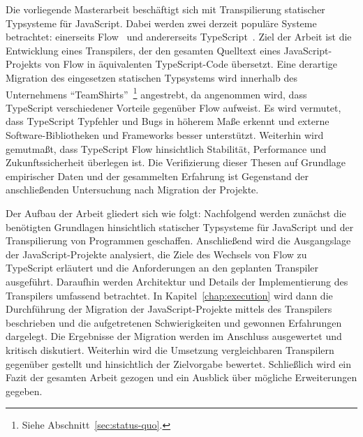 Die vorliegende Masterarbeit beschäftigt sich mit Transpilierung statischer Typsysteme für JavaScript. Dabei werden zwei derzeit populäre Systeme betrachtet: einerseits Flow~\autocite{FLOW_PAPER} und andererseits TypeScript~\autocite{TYPESCRIPT_SPEC}. Ziel der Arbeit ist die Entwicklung eines Transpilers, der den gesamten Quelltext eines JavaScript-Projekts von Flow in äquivalenten TypeScript-Code übersetzt. Eine derartige Migration des eingesetzen statischen Typsystems wird innerhalb des Unternehmens \enquote{TeamShirts}~\footnote{Siehe Abschnitt~\ref{sec:status-quo}.} angestrebt, da angenommen wird, dass TypeScript verschiedener Vorteile gegenüber Flow aufweist. Es wird vermutet, dass TypeScript Typfehler und Bugs in höherem Maße erkennt und externe Software-Bibliotheken und Frameworks besser unterstützt. Weiterhin wird gemutmaßt, dass TypeScript Flow hinsichtlich Stabilität, Performance und Zukunftssicherheit überlegen ist. Die Verifizierung dieser Thesen auf Grundlage empirischer Daten und der gesammelten Erfahrung ist Gegenstand der anschließenden Untersuchung nach Migration der Projekte.

Der Aufbau der Arbeit gliedert sich wie folgt: Nachfolgend werden zunächst die benötigten Grundlagen hinsichtlich statischer Typsysteme für JavaScript und der Transpilierung von Programmen geschaffen. Anschließend wird die Ausgangslage der JavaScript-Projekte analysiert, die Ziele des Wechsels von Flow zu TypeScript erläutert und die Anforderungen an den geplanten Transpiler ausgeführt. Daraufhin werden Architektur und Details der Implementierung des Transpilers umfassend betrachtet. In Kapitel~\ref{chap:execution} wird dann die Durchführung der Migration der JavaScript-Projekte mittels des Transpilers beschrieben und die aufgetretenen Schwierigkeiten und gewonnen Erfahrungen dargelegt. Die Ergebnisse der Migration werden im Anschluss ausgewertet und kritisch diskutiert. Weiterhin wird die Umsetzung vergleichbaren Transpilern gegenüber gestellt und hinsichtlich der Zielvorgabe bewertet. Schließlich wird ein Fazit der gesamten Arbeit gezogen und ein Ausblick über mögliche Erweiterungen gegeben.
